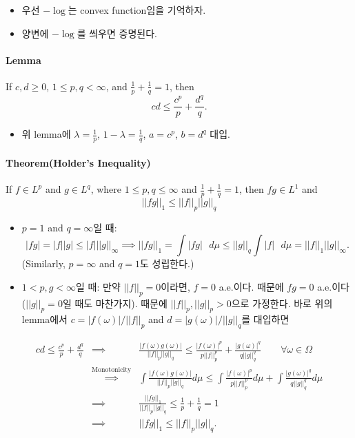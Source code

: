 \documentclass[]{article}
\providecommand{\tightlist}{%
  \setlength{\itemsep}{0pt}\setlength{\parskip}{0pt}}
\let\oldparagraph\paragraph
\renewcommand{\paragraph}[1]{\oldparagraph{#1}\mbox{}}
\begin{document}
\begin{itemize}
\item
  우선 \(-\log\)는 convex function임을 기억하자.
\item
  양변에 \(-\log\)를 씌우면 증명된다.
\end{itemize}

\hypertarget{lemma-1}{%
\paragraph{Lemma}\label{lemma-1}}

If \(c,d\ge 0\), \(1\le p,q<\infty\), and \(\frac{1}{p}+\frac{1}{q}=1\),
then \[
cd\le \frac{c^p}{p}+\frac{d^q}{q}.
\]

\begin{itemize}
\tightlist
\item
  위 lemma에 \(\lambda=\frac{1}{p}\), \(1-\lambda=\frac{1}{q}\),
  \(a=c^p\), \(b=d^q\) 대입.
\end{itemize}

\hypertarget{theoremholders-inequality}{%
\paragraph{Theorem(Holder's
Inequality)}\label{theoremholders-inequality}}

If \(f\in L^p\) and \(g\in L^q\), where \(1\le p,q\le \infty\) and
\(\frac{1}{p}+\frac{1}{q}=1\), then \(fg\in L^1\) and \[
||fg||_1\le ||f||_p||g||_q
\]

\begin{itemize}
\item
  \(p=1\) and \(q=\infty\)일 때: \[
     |fg|=|f||g|\le|f|||g||_{\infty}\implies  ||fg||_1 = \int|fg|\mbox{ }d\mu \le ||g||_q\int|f|\mbox{ }d\mu=||f||_1||g||_\infty.
     \] (Similarly, \(p=\infty\) and \(q=1\)도 성립한다.)
\item
  \(1<p,g<\infty\)일 때: 만약 \(||f||_p=0\)이라면, \(f=0\) a.e.이다.
  때문에 \(fg=0\) a.e.이다(\(||g||_p=0\)일 때도 마찬가지). 때문에
  \(||f||_p,||g||_p>0\)으로 가정한다. 바로 위의 lemma에서
  \(c=|f(\omega)|/||f||_p\) and \(d=|g(\omega)|/||g||_q\)를 대입하면
\end{itemize}

\[\begin{eqnarray*}
cd\le \frac{c^p}{p}+\frac{d^q}{q} &\implies& \frac{|f(\omega)g(\omega)| }{||f||_p ||g||_q}\le \frac{|f(\omega)|^p}{p||f||_p^p} +\frac{|g(\omega)|^q}{q||g||_q^q}\mbox{ }\mbox{ }\mbox{ }\forall \omega\in \Omega\\
&\stackrel{\text{Monotonicity}}\implies& \int \frac{|f(\omega)g(\omega)| }{||f||_p ||g||_q}d\mu\le\int\frac{|f(\omega)|^p}{p||f||_p^p}d\mu +\int\frac{|g(\omega)|^q}{q||g||_q^q}d\mu\\
&\implies& \frac{||fg||_1}{||f||_p ||g||_q}\le \frac{1}{p}+\frac{1}{q} =1 \\
&\implies& ||fg||_1\le ||f||_p ||g||_q.  
\end{eqnarray*}\]
\end{document}
